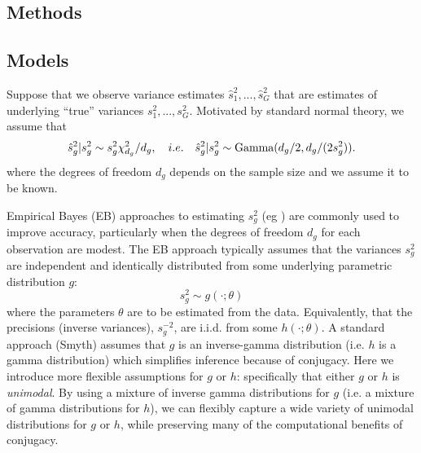 \documentclass{bioinfo}
\begin{document}
\begin{methods}
\section{Methods}
\subsection{Models}
Suppose that we observe variance estimates $\hat{s}_1^2,...,\hat{s}_G^2$ that are estimates of underlying ``true'' variances $s_1^2,...,s_G^2$.  Motivated by
standard normal theory, we assume 
that 
\begin{equation}
\hat{s}_g^2|s_g^2 \sim s_g^2 \chi^2_{d_g}/d_g, \quad i.e. \quad \hat{s}_g^2|s_g^2\sim \textrm{Gamma}(d_g/2,d_g/(2s_g^2)). \label{eqn:selik}
\end{equation}
where the degrees of freedom $d_g$ depends on the sample size and we assume it to be known. 

Empirical Bayes (EB) approaches to estimating $s^2_g$ (eg \citep{smyth2004limma}) are commonly used to improve accuracy, particularly when the degrees of freedom $d_g$ for each observation are modest. The EB approach typically assumes that the variances $s^2_g$ are independent and identically distributed from some underlying parametric distribution $g$: 
\begin{equation}
s^2_g \sim g(\cdot; \theta)
\end{equation}
where the parameters $\theta$ are to be estimated from the data. Equivalently, that the precisions (inverse variances), $s^{-2}_g$, are i.i.d. from some $h(\cdot; \theta)$. A standard approach (Smyth) assumes that $g$ is an inverse-gamma distribution (i.e. $h$ is a gamma distribution) which simplifies inference because of conjugacy. Here we introduce more flexible assumptions for $g$ or $h$: specifically that either $g$ or $h$ is {\it unimodal}.  By using a mixture of inverse gamma distributions for $g$ (i.e. a mixture of gamma distributions for $h$), we can flexibly capture a wide variety of unimodal distributions for $g$ or $h$, while preserving many of the computational benefits of conjugacy.



\end{methods}
\end{document}
